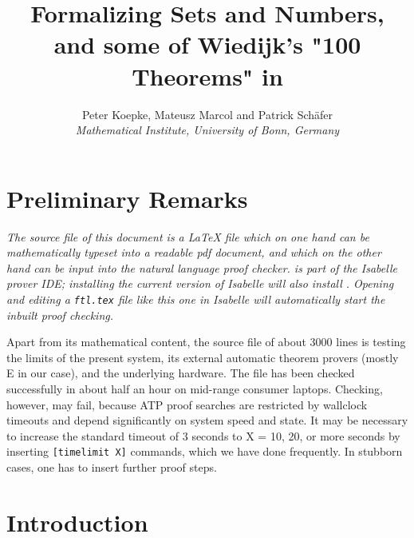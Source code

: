 \documentclass{article}
\begin{document}
\newcommand{\Prod}[3]{#1_{#2} \cdots #1_{#3}}
\newcommand{\Seq}[2]{\{#1,\dots,#2\}}
\newcommand{\FinSet}[3]{\{#1_{#2},\dots,#1_{#3}\}}
\newcommand{\Primes}{\mathbb{P}}
\newcommand{\pow}{{\cal P}}
\newcommand{\range}{\operatorname{ran}}
\newcommand{\inv}[1]{#1^{-1}}
\newcommand{\sset}[2]{\{#1\}_{#2}}

\title{Formalizing Sets and Numbers, and some of Wiedijk's
"100 Theorems" in \Naproche{}}

\author{Peter Koepke, Mateusz Marcol and Patrick Schäfer\\
\emph{Mathematical Institute, University of Bonn, Germany}
}

\maketitle

\section*{Preliminary Remarks}

{\em The source file of this document is a \LaTeX{} file which on one hand can be mathematically
typeset into a readable pdf document, and which on the other hand can
be input into the \Naproche{} natural language proof checker. \Naproche{} is part of the
Isabelle prover IDE; installing the current version of Isabelle will also
install \Naproche{}. Opening and editing a \verb+ftl.tex+ file like this one 
in Isabelle will automatically start the inbuilt \Naproche{} proof checking.

Apart from its mathematical content, the source file of about 3000
lines is testing the limits of the present \Naproche{}
system, its external automatic theorem provers (mostly E in our case),
and the underlying hardware. The file has been checked successfully 
in about half an hour on mid-range consumer
laptops. Checking, however, may fail, because ATP proof searches
are restricted by wallclock timeouts and depend significantly on system speed and state.
It may be necessary to increase the standard timeout of 3 seconds to X = 10, 20, or
more seconds by inserting \verb+[timelimit X]+ commands, which we have done
frequently. In stubborn cases, one has to insert further proof steps.}

\tableofcontents

\newpage

\section{Introduction}
\end{document}
